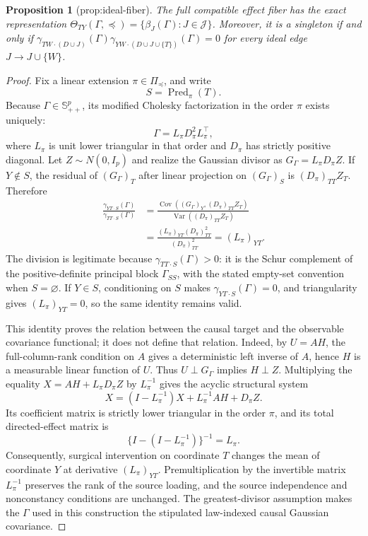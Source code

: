 \documentclass{article}
\newtheorem{proposition}{Proposition}
\begin{document}
\begin{proposition}[prop:ideal-fiber]\label{prop:ideal-fiber}
The full compatible effect fiber has the exact representation \(\Theta_{TY}(\Gamma,\preceq)=\{\beta_J(\Gamma):J\in\mathcal J\}\). Moreover, it is a singleton if and only if \(\gamma_{TW\cdot(D\cup J)}(\Gamma)\gamma_{YW\cdot(D\cup J\cup\{T\})}(\Gamma)=0\) for every ideal edge \(J\to J\cup\{W\}\).
\end{proposition}
\begin{proof}
Fix a linear extension \(\pi\in\Pi_{\preceq}\), and write
\[
 S=\operatorname{Pred}_{\pi}(T).
\]
Because \(\Gamma\in\mathbb S_{++}^{p}\), its modified Cholesky factorization in the order \(\pi\) exists uniquely:
\[
 \Gamma=L_{\pi}D_{\pi}^{2}L_{\pi}^{\top},
\]
where \(L_{\pi}\) is unit lower triangular in that order and \(D_{\pi}\) has strictly positive diagonal.  Let \(Z\sim N(0,I_p)\) and realize the Gaussian divisor as \(G_{\Gamma}=L_{\pi}D_{\pi}Z\).  If \(Y\notin S\), the residual of \((G_{\Gamma})_T\) after linear projection on \((G_{\Gamma})_S\) is \((D_{\pi})_{TT}Z_T\).  Therefore
\[
 \begin{aligned}
 \frac{\gamma_{YT\cdot S}(\Gamma)}{\gamma_{TT\cdot S}(\Gamma)}
 &=\frac{\operatorname{Cov}\!\left((G_{\Gamma})_Y,(D_{\pi})_{TT}Z_T\right)}
         {\operatorname{Var}\!\left((D_{\pi})_{TT}Z_T\right)}\\
 &=\frac{(L_{\pi})_{YT}(D_{\pi})_{TT}^{2}}
         {(D_{\pi})_{TT}^{2}}
 =(L_{\pi})_{YT}.
 \end{aligned}
\]
The division is legitimate because
\(\gamma_{TT\cdot S}(\Gamma)>0\): it is the Schur complement of the positive-definite principal block \(\Gamma_{SS}\), with the stated empty-set convention when \(S=\varnothing\).  If \(Y\in S\), conditioning on \(S\) makes \(\gamma_{YT\cdot S}(\Gamma)=0\), and triangularity gives \((L_{\pi})_{YT}=0\), so the same identity remains valid.

This identity proves the relation between the causal target and the observable covariance functional; it does not define that relation.  Indeed, by \(U=AH\), the full-column-rank condition on \(A\) gives a deterministic left inverse of \(A\), hence \(H\) is a measurable linear function of \(U\).  Thus \(U\perp G_{\Gamma}\) implies \(H\perp Z\).  Multiplying the equality \(X=AH+L_{\pi}D_{\pi}Z\) by \(L_{\pi}^{-1}\) gives the acyclic structural system
\[
 X=(I-L_{\pi}^{-1})X+L_{\pi}^{-1}AH+D_{\pi}Z.
\]
Its coefficient matrix is strictly lower triangular in the order \(\pi\), and its total directed-effect matrix is
\[
 \{I-(I-L_{\pi}^{-1})\}^{-1}=L_{\pi}.
\]
Consequently, surgical intervention on coordinate \(T\) changes the mean of coordinate \(Y\) at derivative \((L_{\pi})_{YT}\).  Premultiplication by the invertible matrix \(L_{\pi}^{-1}\) preserves the rank of the source loading, and the source independence and nonconstancy conditions are unchanged.  The greatest-divisor assumption makes the \(\Gamma\) used in this construction the stipulated law-indexed causal Gaussian covariance.


\end{proof}
\end{document}
